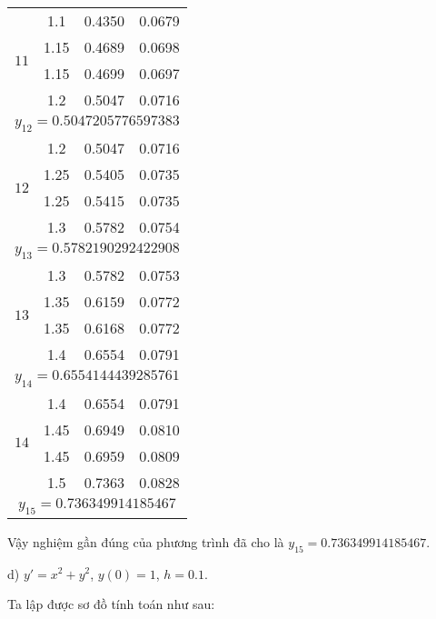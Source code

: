 \begin{longtable}{|c|c|c|c|}
\multirow{4}{*}{$11$}
&1.1 &0.4350 &0.0679 \\ \cline{2-4}
&1.15 &0.4689 &0.0698 \\ \cline{2-4}
&1.15 &0.4699 &0.0697 \\ \cline{2-4}
&1.2 &0.5047 &0.0716 \\ \hline
\multicolumn{4}{|c|}{$y_{12} = 0.5047205776597383$} \\ \hline

\multirow{4}{*}{$12$}
&1.2 &0.5047 &0.0716 \\ \cline{2-4}
&1.25 &0.5405 &0.0735 \\ \cline{2-4}
&1.25 &0.5415 &0.0735 \\ \cline{2-4}
&1.3 &0.5782 &0.0754 \\ \hline
\multicolumn{4}{|c|}{$y_{13} = 0.5782190292422908$} \\ \hline

\multirow{4}{*}{$13$}
&1.3 &0.5782 &0.0753 \\ \cline{2-4}
&1.35 &0.6159 &0.0772 \\ \cline{2-4}
&1.35 &0.6168 &0.0772 \\ \cline{2-4}
&1.4 &0.6554 &0.0791 \\ \hline
\multicolumn{4}{|c|}{$y_{14} = 0.6554144439285761$} \\ \hline

\multirow{4}{*}{$14$}
&1.4 &0.6554 &0.0791 \\ \cline{2-4}
&1.45 &0.6949 &0.0810 \\ \cline{2-4}
&1.45 &0.6959 &0.0809 \\ \cline{2-4}
&1.5 &0.7363 &0.0828 \\ \hline
\multicolumn{4}{|c|}{$y_{15} = 0.736349914185467$} \\ \hline

\end{longtable}

Vậy nghiệm gần đúng của phương trình đã cho là $y_{15} = 0.736349914185467$.\par

d) $y'=x^2+y^2$, $y(0)=1$, $h=0.1$.\par
Ta lập được sơ đồ tính toán như sau:

